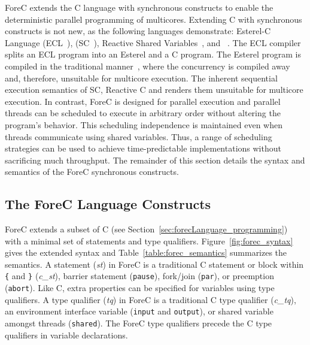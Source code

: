 ForeC extends the C language with synchronous constructs to 
enable the deterministic parallel programming of multicores.
Extending C with synchronous constructs is not new, as the 
following languages demonstrate: Esterel-C Language (ECL~\cite{timed_ecl}), 
\synchronousc{} (SC~\cite{timed_synccharts_c_proposal}), Reactive 
Shared Variables~\cite{timed_reactivec_shared_variables}, 
and \pretc{}~\cite{pret_pretc}. The ECL compiler splits an 
ECL program into an Esterel and a C program. The Esterel program
is compiled in the traditional manner~\cite{timed_compiling_esterel}, 
where the concurrency is compiled away and, therefore, unsuitable for multicore execution.
The inherent sequential execution semantics of SC, Reactive C 
and \pretc{} renders them unsuitable for multicore execution. In
contrast, ForeC is designed for parallel execution and parallel 
threads can be scheduled to execute in arbitrary order without 
altering the program's behavior. This scheduling 
independence is maintained even when threads communicate using 
shared variables. Thus, a range of scheduling strategies can be 
used to achieve time-predictable implementations without sacrificing
much throughput. The remainder of this section details the 
syntax and semantics of the ForeC synchronous constructs.



\subsection{The ForeC Language Constructs}
ForeC extends a subset of C (see
Section~\ref{sec:forecLanguage_programming}) with a minimal
set of statements and type qualifiers.
Figure~\ref{fig:forec_syntax} gives the extended syntax and
Table~\ref{table:forec_semantics} summarizes the semantics.
A statement (\emph{st}) in ForeC is a traditional C
statement or block within \verb${$ and \verb$}$
(\emph{c\_st}), barrier statement (\verb$pause$), fork/join
(\verb$par$), or preemption (\verb$abort$). Like C, extra
properties can be specified for variables using type
qualifiers. A type qualifier (\emph{tq}) in ForeC is a
traditional C type qualifier (\emph{c\_tq}), an environment
interface variable (\verb$input$ and \verb$output$), or
shared variable amongst threads (\verb$shared$). The ForeC
type qualifiers precede the C type qualifiers in variable
declarations. 

